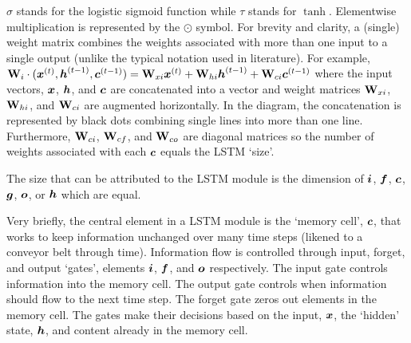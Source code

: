\noindent
%
$\sigma$ stands for the logistic sigmoid function while $\tau$ stands for $\tanh$.
%
Elementwise multiplication is represented by the $\odot$ symbol.
%
For brevity and clarity, a (single) weight matrix combines the weights associated with more than one input to a single output (unlike the typical notation used in literature).
%
For example, $\mathbf{W}_i \cdot(\boldsymbol{x}\sp{(t)},\boldsymbol{h}\sp{(t-1)},\boldsymbol{c}\sp{(t-1)})=\mathbf{W}_{xi}\boldsymbol{x}\sp{(t)}+\mathbf{W}_{hi}\boldsymbol{h}\sp{(t-1)}+\mathbf{W}_{ci}\boldsymbol{c}\sp{(t-1)}$ where the input vectors, $\boldsymbol{x}$, $\boldsymbol{h}$, and $\boldsymbol{c}$ are concatenated into a vector  and weight matrices $\mathbf{W}_{xi}$, $\mathbf{W}_{hi}$, and $\mathbf{W}_{ci}$ are augmented horizontally. %
%
In the diagram, the concatenation is represented by black dots combining single lines into more than one line.
%
Furthermore, $\mathbf{W}_{ci}$, $\mathbf{W}_{cf}$, and $\mathbf{W}_{co}$ are diagonal matrices so the number of weights associated with each $\boldsymbol{c}$ equals the LSTM `size'.


The size that can be attributed to the LSTM module is the dimension of $\boldsymbol{i}$, $\boldsymbol{f}$, $\boldsymbol{c}$, $\boldsymbol{g}$, $\boldsymbol{o}$, or $\boldsymbol{h}$ which are equal.


Very briefly, the central element in a LSTM module is the `memory cell', $\boldsymbol{c}$, that works to keep information unchanged over many time steps (likened to a conveyor belt through time).
%
Information flow is controlled through input, forget, and output `gates', elements $\boldsymbol{i}$, $\boldsymbol{f}$, and $\boldsymbol{o}$ respectively.
%
The input gate controls information into the memory cell.
%
The output gate controls when information should flow to the next time step.
%
The forget gate zeros out elements in the memory cell.
%
The gates make their decisions based on the input, $\boldsymbol{x}$, the `hidden' state, $\boldsymbol{h}$, and content already in the memory cell.
%





